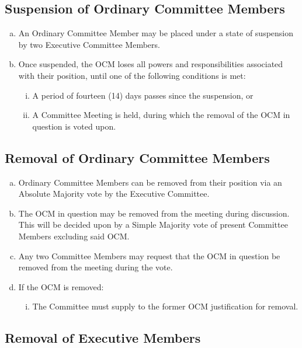 \documentclass[a4paper,12pt]{article}
\begin{document}
\subsection{Suspension of Ordinary Committee Members}

\begin{enumerate}[a)]
	\item An Ordinary Committee Member may be placed under a state of suspension by two Executive Committee Members.
	\item Once suspended, the OCM loses all powers and responsibilities associated with their position, until one of the following conditions is met:
	\begin{enumerate}[i)]
		\item A period of fourteen (14) days passes since the suspension, or
		\item A Committee Meeting is held, during which the removal of the OCM in question is voted upon.
	\end{enumerate}
\end{enumerate}

\subsection{Removal of Ordinary Committee Members}

\begin{enumerate}[a)]
	\item Ordinary Committee Members can be removed from their position via an Absolute Majority vote by the Executive Committee.
	\item The OCM in question may be removed from the meeting during discussion. This will be decided upon by a Simple Majority vote of present Committee Members excluding said OCM. 
	\item Any two Committee Members may request that the OCM in question be removed from the meeting during the vote.
	\item If the OCM is removed:
	\begin{enumerate}[i)]
		\item The Committee must supply to the former OCM justification for removal.
	\end{enumerate}
\end{enumerate}

\subsection{Removal of Executive Members}
\end{document}
